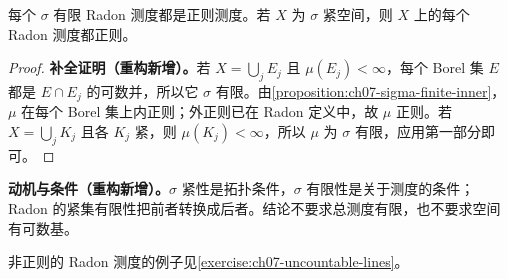 \documentclass[../../main.tex]{subfiles}
\begin{document}
\begin{corollary}\label{corollary:ch07-sigma-finite-regular}
每个 $\sigma$ 有限 Radon 测度都是正则测度。若 $X$ 为 $\sigma$ 紧空间，则 $X$ 上的每个 Radon 测度都正则。
\end{corollary}
\begin{proof}
\textbf{补全证明（重构新增）。}若 $X=\bigcup_j E_j$ 且 $\mu(E_j)<\infty$，每个 Borel 集 $E$ 都是 $E\cap E_j$ 的可数并，所以它 $\sigma$ 有限。由\cref{proposition:ch07-sigma-finite-inner}，$\mu$ 在每个 Borel 集上内正则；外正则已在 Radon 定义中，故 $\mu$ 正则。若 $X=\bigcup_j K_j$ 且各 $K_j$ 紧，则 $\mu(K_j)<\infty$，所以 $\mu$ 为 $\sigma$ 有限，应用第一部分即可。
\end{proof}
\begin{remark}
\textbf{动机与条件（重构新增）。}$\sigma$ 紧性是拓扑条件，$\sigma$ 有限性是关于测度的条件；Radon 的紧集有限性把前者转换成后者。结论不要求总测度有限，也不要求空间有可数基。
\end{remark}
非正则的 Radon 测度的例子见\cref{exercise:ch07-uncountable-lines}。
\end{document}
